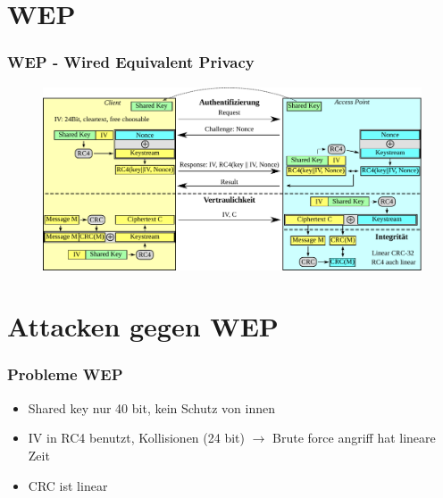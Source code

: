 \documentclass{beamer}
\begin{document}
\section{WEP}
\begin{frame}
\frametitle{WEP - Wired Equivalent Privacy}
\begin{figure}
	\includegraphics[width=1.0\linewidth]{figures/WEP_complete.pdf}
\end{figure}
\end{frame}


\section{Attacken gegen WEP}
\begin{frame}
\frametitle{Probleme WEP}
\begin{itemize}
	\item Shared key nur 40 bit, kein Schutz von innen
	\item IV in RC4 benutzt, Kollisionen (24 bit) $\rightarrow$ Brute force angriff hat lineare Zeit
	\item CRC ist linear
\end{itemize}

\end{frame}
\end{document}
